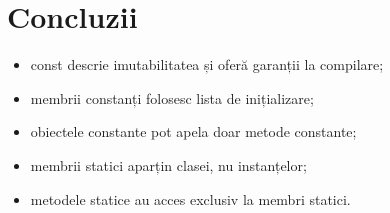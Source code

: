 \documentclass[12pt,a4paper]{article}
\begin{document}
\section{Concluzii}

\begin{itemize}
\item const descrie imutabilitatea și oferă garanții la compilare;
\item membrii constanți folosesc lista de inițializare;
\item obiectele constante pot apela doar metode constante;
\item membrii statici aparțin clasei, nu instanțelor;
\item metodele statice au acces exclusiv la membri statici.
\end{itemize}
\end{document}
